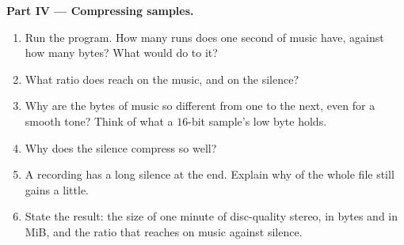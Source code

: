 \begin{problem}
\medskip\noindent\textbf{Part IV --- Compressing samples.}
\begin{enumerate}[resume]
  \item Run the program. How many runs does one second of music have, against how many bytes? What would  do to it?
  \item What ratio does  reach on the music, and on the silence?
  \item Why are the bytes of music so different from one to the next, even for a smooth tone? Think of what a $16$-bit
    sample's low byte holds.
  \item Why does the silence compress so well?
  \item A recording has a long silence at the end. Explain why   of the whole file still gains a
    little.
  \item State the result: the size of one minute of disc-quality stereo, in bytes and in MiB, and the ratio that
     reaches on music against silence.
\end{enumerate}
\end{problem}
